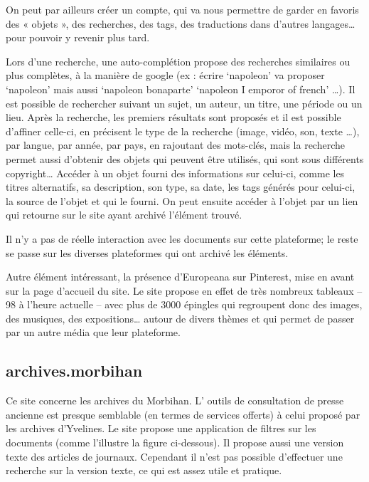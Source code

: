        On peut par ailleurs créer un compte, qui va nous permettre de garder en favoris des « objets », des recherches, des tags,
        des traductions dans d’autres langages… pour pouvoir y revenir plus tard.

        Lors d’une recherche, une auto-complétion propose des recherches similaires ou plus complètes, à la manière de google
        (ex : écrire ‘napoleon’ va proposer ‘napoleon’ mais aussi ‘napoleon bonaparte’ ‘napoleon I emporor of french’ …).
        Il est possible de rechercher suivant un sujet, un auteur, un titre, une période ou un lieu. Après la recherche,
        les premiers résultats sont proposés et il est possible d’affiner celle-ci, en précisent le type de la recherche
        (image, vidéo, son, texte …), par langue, par année, par pays, en rajoutant des mots-clés, mais la recherche permet aussi
        d’obtenir des objets qui peuvent être utilisés, qui sont sous différents copyright… Accéder à un objet fourni
        des informations sur celui-ci, comme les titres alternatifs, sa description, son type, sa date, les tags générés pour celui-ci,
        la source de l’objet et qui le fourni. On peut ensuite accéder à l’objet par un lien qui retourne sur le site ayant archivé l’élément trouvé.

        Il n’y a pas de réelle interaction avec les documents sur cette plateforme; le reste se passe sur les diverses plateformes qui ont archivé les éléments.

        Autre élément intéressant, la présence d’Europeana sur Pinterest, mise en avant sur la page d’accueil du site.
        Le site propose en effet de très nombreux tableaux – 98 à l’heure actuelle – avec plus de 3000 épingles qui regroupent
        donc des images, des musiques, des expositions… autour de divers thèmes et qui permet de passer par un autre média que leur plateforme.


        \subsection{archives.morbihan}
        \label{subsec:morbihan}
        Ce site concerne les archives du Morbihan. L’ outils de consultation de presse ancienne est presque semblable
        (en termes de services offerts) à celui proposé par les archives d’Yvelines. Le site propose une application
        de filtres sur les documents (comme l’illustre la figure ci-dessous). Il propose aussi une version texte des
        articles de journaux. Cependant il n’est pas possible d’effectuer une recherche sur la version texte,
        ce qui est assez utile et pratique.

